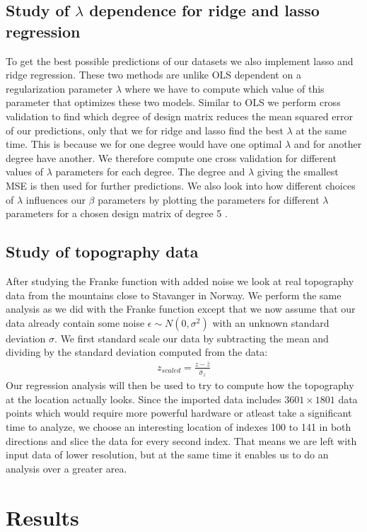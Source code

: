 \documentclass[12pt]{article}
\begin{document}
\subsection{Study of $\lambda$ dependence for ridge and lasso regression}
To get the best possible predictions of our datasets we also implement lasso and ridge regression. These two methods are unlike OLS dependent on a regularization parameter $\lambda$ where we have to compute which value of this parameter that optimizes these two models. Similar to OLS we perform cross validation to find which degree of design matrix reduces the mean squared error of our predictions, only that we for ridge and lasso find the best $\lambda$ at the same time. This is because we for one degree would have one optimal $\lambda$ and for another degree have another. We therefore compute one cross validation for different values of $\lambda$ parameters for each degree. The degree and $\lambda$ giving the smallest MSE is then used for further predictions. We also look into how different choices of $\lambda$ influences our $\beta$ parameters by plotting the parameters for different $\lambda$ parameters for a chosen design matrix of degree 5 .


\subsection{Study of topography data}
After studying the Franke function with added noise we look at real topography data from the mountains close to Stavanger in Norway. We perform the same analysis as we did with the Franke function except that we now assume that our data already contain some noise $\epsilon \sim N(0, \sigma^2)$ with an unknown standard deviation $\sigma$. We first standard scale our data by subtracting the mean and dividing by the standard deviation computed from the data:
\begin{align*}
  z_{scaled} = \frac{z-\bar{z}}{\hat{\sigma}_z}
\end{align*}
Our regression analysis will then be used to try to compute how the topography at the location actually looks. Since the imported data includes  $3601 \times1801$ data points which would require more powerful hardware or atleast take a significant time to analyze, we choose an interesting location of indexes 100 to 141 in both directions and slice the data for every second index. That means we are left with input data of lower resolution, but at the same time it enables us to do an analysis over a greater area.
\section{Results}
\end{document}
